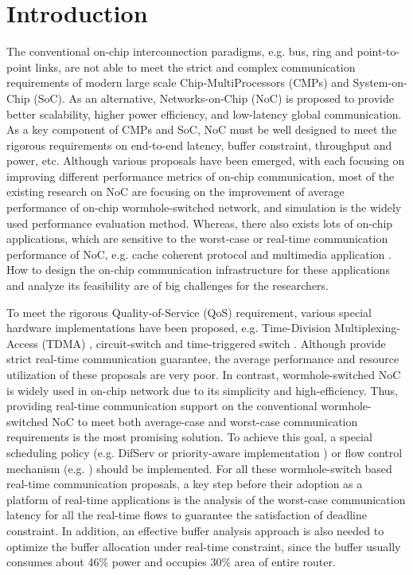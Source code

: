 \documentclass[10pt,journal]{IEEEtran}
\begin{document}
\section{Introduction}
The conventional on-chip interconnection paradigms, e.g. bus, ring and point-to-point links, are not able to meet the strict and complex communication requirements of modern large scale Chip-MultiProcessors (CMPs) and System-on-Chip (SoC). As an alternative, Networks-on-Chip (NoC) is proposed to provide better scalability, higher power efficiency, and low-latency global communication. As a key component of CMPs and SoC, NoC must be well designed to meet the rigorous requirements on end-to-end latency, buffer constraint, throughput and power, etc. Although various proposals have been emerged, with each focusing on improving different performance metrics of on-chip communication, most of the existing research on NoC are focusing on the improvement of average performance of on-chip wormhole-switched network, and simulation is the widely used performance evaluation method. Whereas, there also exists lots of on-chip applications, which are sensitive to the worst-case or real-time communication performance of NoC, e.g. cache coherent protocol \cite{Bolotin2007} and multimedia application \cite{ostermann2004video}. How to design the on-chip communication infrastructure for these applications and analyze its feasibility are of big challenges for the researchers.

To meet the rigorous Quality-of-Service (QoS) requirement, various special hardware implementations have been proposed, e.g. Time-Division Multiplexing-Access (TDMA) \cite{GoDR05}, circuit-switch \cite{6628254} and time-triggered switch \cite{4617280}. Although provide strict real-time communication guarantee, the average performance and resource utilization of these proposals are very poor. In contrast, wormhole-switched NoC is widely used in on-chip network due to its simplicity and high-efficiency. Thus, providing real-time communication support on the conventional wormhole-switched NoC to meet both average-case and worst-case communication requirements is the most promising solution. To achieve this goal, a special scheduling policy (e.g. DifServ \cite{1411140} or priority-aware implementation \cite{Shi:2008:RCA:1397757.1397996}\cite{708526}\cite{627905}) or flow control mechanism (e.g. \cite{Li199649}\cite{707545}) should be implemented. For all these wormhole-switch based real-time communication proposals, a key step before their adoption as a platform of real-time applications is the analysis of the worst-case communication latency for all the real-time flows to guarantee the satisfaction of deadline constraint. In addition, an effective buffer analysis approach is also needed to optimize the buffer allocation under real-time constraint, since the buffer usually consumes about 46\% power \cite{pkundu} and occupies 30\% area \cite{5507566} of entire router.
\end{document}
